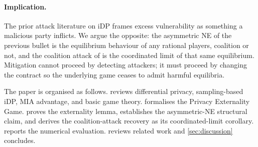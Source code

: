 \paragraph{Implication.}
The prior attack literature on iDP frames excess vulnerability as
something a malicious party inflicts. We argue the opposite: the
asymmetric NE of the previous bullet is the equilibrium behaviour of
any rational players, coalition or not, and the coalition attack of
\citet{kaiser2026your} is the coordinated limit of that same
equilibrium. Mitigation cannot proceed by detecting attackers; it must
proceed by changing the contract so the underlying game ceases to admit
harmful equilibria.

The paper is organised as follows.  reviews
differential privacy, sampling-based iDP, MIA advantage, and basic game
theory.  formalises the Privacy Externality Game.
 proves the externality lemma, establishes the
asymmetric-NE structural claim, and derives the coalition-attack
recovery as its coordinated-limit corollary.
 reports the numerical evaluation. 
reviews related work and \cref{sec:discussion} concludes.
